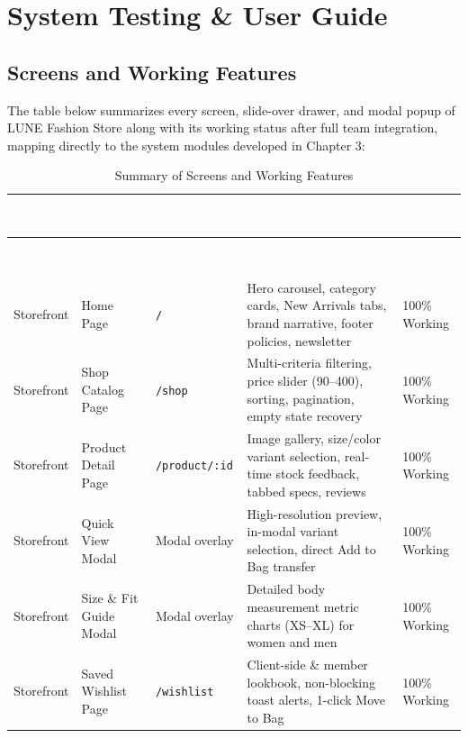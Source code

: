 \documentclass[12pt,a4paper,oneside]{report}
\begin{document}
\chapter{System Testing \& User Guide}

\section{Screens and Working Features}
The table below summarizes every screen, slide-over drawer, and modal popup of LUNE Fashion Store along with its working status after full team integration, mapping directly to the system modules developed in Chapter 3:

\begin{longtable}{|p{1.9cm}|p{3.3cm}|p{2.5cm}|p{5.5cm}|p{1.6cm}|}
\caption{Summary of Screens and Working Features} \\
\hline
\rowcolor{PrimaryBrown}
\textcolor{white}{\textbf{Area}} & \textcolor{white}{\textbf{Screen / Feature}} & \textcolor{white}{\textbf{Route / View}} & \textcolor{white}{\textbf{Main Working Features}} & \textcolor{white}{\textbf{Status}} \\
\hline
\endfirsthead
\hline
\rowcolor{PrimaryBrown}
\textcolor{white}{\textbf{Area}} & \textcolor{white}{\textbf{Screen / Feature}} & \textcolor{white}{\textbf{Route / View}} & \textcolor{white}{\textbf{Main Working Features}} & \textcolor{white}{\textbf{Status}} \\
\hline
\endhead
\hline
\endfoot
Storefront & Home Page & \texttt{/} & Hero carousel, category cards, New Arrivals tabs, brand narrative, footer policies, newsletter & 100\% Working \\
\hline
Storefront & Shop Catalog Page & \texttt{/shop} & Multi-criteria filtering, price slider (90--400), sorting, pagination, empty state recovery & 100\% Working \\
\hline
Storefront & Product Detail Page & \texttt{/product/:id} & Image gallery, size/color variant selection, real-time stock feedback, tabbed specs, reviews & 100\% Working \\
\hline
Storefront & Quick View Modal & Modal overlay & High-resolution preview, in-modal variant selection, direct Add to Bag transfer & 100\% Working \\
\hline
Storefront & Size \& Fit Guide Modal & Modal overlay & Detailed body measurement metric charts (XS--XL) for women and men & 100\% Working \\
\hline
Storefront & Saved Wishlist Page & \texttt{/wishlist} & Client-side \& member lookbook, non-blocking toast alerts, 1-click Move to Bag & 100\% Working \\

\end{longtable}
\end{document}
